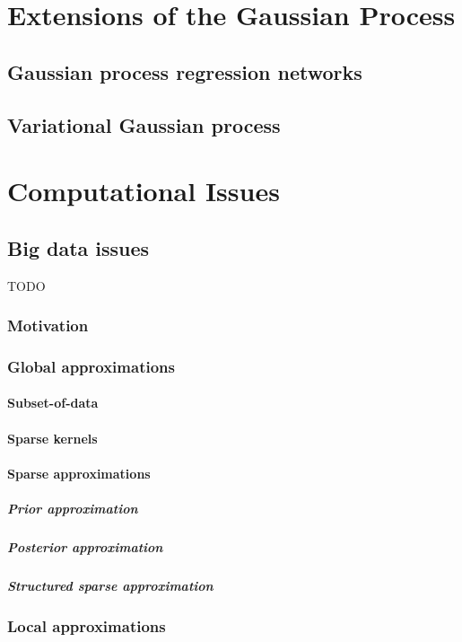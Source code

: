 \documentclass[10pt]{article}
\begin{document}
\section{Extensions of the Gaussian Process}


\subsection{Gaussian process regression networks \cite{gprn}}


\subsection{Variational Gaussian process \cite{vgp}}



\section{Computational Issues}

\subsection{Big data issues \cite{big-data}}
TODO


\subsubsection{Motivation}


\subsubsection{Global approximations}

\paragraph{Subset-of-data}

\paragraph{Sparse kernels}

\paragraph{Sparse approximations}
\subparagraph{Prior approximation}
\subparagraph{Posterior approximation}
\subparagraph{Structured sparse approximation}


\subsubsection{Local approximations}
\end{document}
